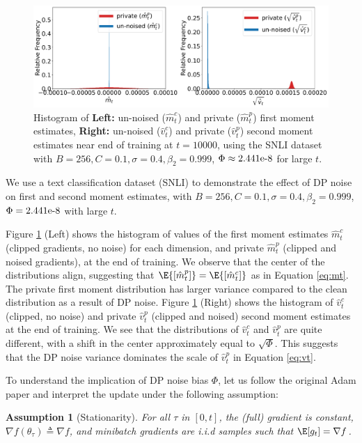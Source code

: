 \documentclass[letterpaper]{article} %
\newtheorem{assumption}{Assumption}
\begin{document}
\begin{figure}[htb]
\centering
\includegraphics[width=0.90\linewidth]{figs/type1_mt_vt_hist_motiv_10001_hat.pdf}
\caption{Histogram of \textbf{Left:} un-noised ($\hat{m}_t^c$) and private ($\hat{m}_t^p$) first moment estimates, \textbf{Right:} un-noised ($\hat{v}_t^c$) and private ($\hat{v}_t^p$) second moment estimates near end of training at $t=10000$, using the SNLI dataset with $B=256, C=0.1, \sigma=0.4, \beta_2=0.999$, $\Phi \approx \textnormal{2.441e-8}$ for large $t$.}
\label{fig:motiv_10001}
\end{figure}

We use a text classification dataset (SNLI) to demonstrate the effect of DP noise on first and second moment estimates, with $B=256, C=0.1, \sigma=0.4, \beta_2=0.999$, $\Phi = \textnormal{2.441e-8}$ with large $t$.

Figure \ref{fig:motiv_10001} (Left) shows the histogram of values of the first moment estimates $\hat{m}_t^c$ (clipped gradients, no noise) for each dimension, and private $\hat{m}_t^p$ (clipped and noised gradients), at the end of training. We observe that the center of the distributions align, suggesting that $\E{[\hat{m}_t^p]} = \E{[\hat{m}_t^c]}$ as in Equation \ref{eq:mt}. The private first moment distribution has larger variance compared to the clean distribution as a result of DP noise. Figure \ref{fig:motiv_10001} (Right) shows the histogram of $\hat{v}_t^c$ (clipped, no noise) and private $\hat{v}_t^p$ (clipped and noised) second moment estimates at the end of training. We see that the distributions of $\hat{v}_t^c$ and $\hat{v}_t^p$ are quite different, with a shift in the center approximately equal to $\sqrt{\Phi}$. This suggests that the DP noise variance dominates the scale of $\hat{v}_t^p$ in Equation \ref{eq:vt}.

To understand the implication of DP noise bias $\Phi$, let us follow the original Adam paper \cite{orig_adam} and interpret the update under the following assumption:

\begin{assumption}[Stationarity]\label{assumption:stationarity}
For all $\tau$ in $[0, t]$, the (full) gradient is constant, $\nabla f(\theta_\tau) \triangleq \nabla f$, and minibatch gradients are i.i.d samples such that $\E[g_t] = \nabla f$.
\end{assumption}
\end{document}
